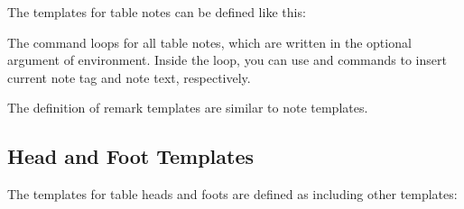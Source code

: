 \documentclass[oneside]{book}
\begin{document}
The templates for table notes can be defined like this:

\begin{codehigh}
\end{codehigh}
\begin{codehigh}
\end{codehigh}

The \CC{\MapTblrNotes} command loops for all table notes,
which are written in the optional argument of  environment.
Inside the loop, you can use \CC{\InsertTblrNoteTag} and \CC{\InsertTblrNoteText}
commands to insert current note tag and note text, respectively.

The definition of remark templates are similar to note templates.
\nopagebreak
\begin{codehigh}
\end{codehigh}
\begin{codehigh}
\end{codehigh}

\subsection{Head and Foot Templates}

The templates for table heads and foots are defined as including other templates:

\begin{codehigh}
\end{codehigh}
\end{document}
